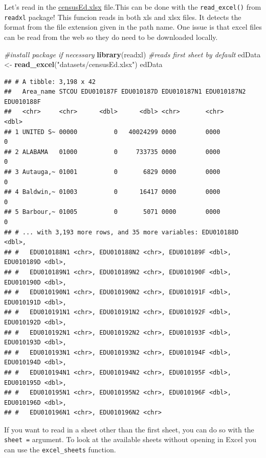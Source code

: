 \documentclass[
]{book}
\newenvironment{Shaded}{\begin{snugshade}}{\end{snugshade}}
\newcommand{\CommentTok}[1]{\textcolor[rgb]{0.56,0.35,0.01}{\textit{#1}}}
\newcommand{\KeywordTok}[1]{\textcolor[rgb]{0.13,0.29,0.53}{\textbf{#1}}}
\newcommand{\NormalTok}[1]{#1}
\newcommand{\StringTok}[1]{\textcolor[rgb]{0.31,0.60,0.02}{#1}}
\theoremstyle{definition}
\theoremstyle{definition}
\theoremstyle{definition}
\theoremstyle{remark}
\begin{document}
Let's read in the \href{https://www4.stat.ncsu.edu/~online/datasets/censusEd.xlsx}{censusEd.xlsx} file.This can be done with the \texttt{read\_excel()} from \texttt{readxl} package! This funcion reads in both xls and xlsx files. It detects the format from the file extension given in the path name. One issue is that excel files can be read from the web so they do need to be downloaded locally.

\begin{Shaded}
\begin{Highlighting}[]
\CommentTok{#install package if necessary}
\KeywordTok{library}\NormalTok{(readxl)}
\CommentTok{#reads first sheet by default}
\NormalTok{edData <-}\StringTok{ }\KeywordTok{read_excel}\NormalTok{(}\StringTok{"datasets/censusEd.xlsx"}\NormalTok{)}
\NormalTok{edData}
\end{Highlighting}
\end{Shaded}

\begin{verbatim}
## # A tibble: 3,198 x 42
##   Area_name STCOU EDU010187F EDU010187D EDU010187N1 EDU010187N2 EDU010188F
##   <chr>     <chr>      <dbl>      <dbl> <chr>       <chr>            <dbl>
## 1 UNITED S~ 00000          0   40024299 0000        0000                 0
## 2 ALABAMA   01000          0     733735 0000        0000                 0
## 3 Autauga,~ 01001          0       6829 0000        0000                 0
## 4 Baldwin,~ 01003          0      16417 0000        0000                 0
## 5 Barbour,~ 01005          0       5071 0000        0000                 0
## # ... with 3,193 more rows, and 35 more variables: EDU010188D <dbl>,
## #   EDU010188N1 <chr>, EDU010188N2 <chr>, EDU010189F <dbl>, EDU010189D <dbl>,
## #   EDU010189N1 <chr>, EDU010189N2 <chr>, EDU010190F <dbl>, EDU010190D <dbl>,
## #   EDU010190N1 <chr>, EDU010190N2 <chr>, EDU010191F <dbl>, EDU010191D <dbl>,
## #   EDU010191N1 <chr>, EDU010191N2 <chr>, EDU010192F <dbl>, EDU010192D <dbl>,
## #   EDU010192N1 <chr>, EDU010192N2 <chr>, EDU010193F <dbl>, EDU010193D <dbl>,
## #   EDU010193N1 <chr>, EDU010193N2 <chr>, EDU010194F <dbl>, EDU010194D <dbl>,
## #   EDU010194N1 <chr>, EDU010194N2 <chr>, EDU010195F <dbl>, EDU010195D <dbl>,
## #   EDU010195N1 <chr>, EDU010195N2 <chr>, EDU010196F <dbl>, EDU010196D <dbl>,
## #   EDU010196N1 <chr>, EDU010196N2 <chr>
\end{verbatim}

If you want to read in a sheet other than the first sheet, you can do so with the \texttt{sheet\ =} argument. To look at the available sheets without opening in Excel you can use the \texttt{excel\_sheets} function.
\end{document}
